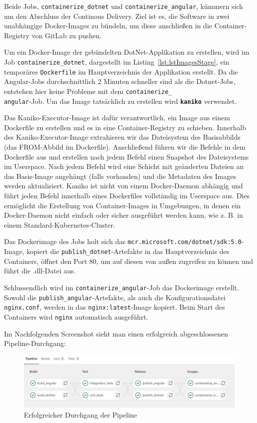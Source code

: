Beide Jobs, \texttt{containerize\_dotnet} und \texttt{containerize\_angular}, kümmern sich um den Abschluss der Continous Delivery. Ziel ist es, die Software in zwei unabhängige Docker-Images zu bündeln, um diese anschließen in die Container-Registry von GitLab zu pushen.

Um ein Docker-Image der gebündelten DotNet-Applikation zu  erstellen, wird im Job \texttt{containerize\_dotnet}, dargestellt im Listing~\ref{lst:lstImagesStage}, ein temporäres \texttt{Dockerfile} im Hauptverzeichnis der Applikation erstellt. Da die Angular-Jobs durchschnittlich 2 Minuten schneller sind als die Dotnet-Jobs, entstehen hier keine Probleme mit dem \texttt{containerize\_\\angular}-Job. Um das Image tatsächlich zu erstellen wird \textbf{\texttt{kaniko}} verwendet.

Das Kaniko-Executor-Image ist dafür verantwortlich, ein Image aus einem Dockerfile zu erstellen und es in eine Container-Registry zu schieben. Innerhalb des Kaniko-Executor-Image extrahieren wir das Dateisystem des Basisabbilds (das FROM-Abbild im Dockerfile). Anschließend führen wir die Befehle in dem Dockerfile aus und erstellen nach jedem Befehl einen Snapshot des Dateisystems im Userspace. Nach jedem Befehl wird eine Schicht mit geänderten Dateien an das Basis-Image angehängt (falls vorhanden) und die Metadaten des Images werden aktualisiert\cite{kaniko}. Kaniko ist nicht von einem Docker-Daemon abhängig und führt jeden Befehl innerhalb eines Dockerfiles vollständig im Userspace aus. Dies ermöglicht die Erstellung von Container-Images in Umgebungen, in denen ein Docker-Daemon nicht einfach oder sicher ausgeführt werden kann, wie z. B. in einem Standard-Kubernetes-Cluster.\cite{kaniko}

Das Dockerimage des Jobs holt sich das \texttt{mcr.microsoft.com/dotnet/sdk:5.0}-Image, kopiert die \texttt{publish\_dotnet}-Artefakte in das Hauptverzeichnis des Containers, öffnet den Port 80, um auf diesen von außen zugreifen zu können und führt die .dll-Datei aus.

Schlussendlich wird im \texttt{containerize\_angular}-Job das Dockerimage erstellt. Sowohl die \texttt{publish\_angular}-Artefakte, als auch die Konfigurationsdatei \texttt{nginx.conf}, werden in das \texttt{nginx:latest}-Image kopiert. Beim Start des Containers wird \texttt{nginx} automatisch ausgeführt.

Im Nachfolgenden Screenshot sieht man einen erfolgreich abgeschlossenen Pipeline-Durchgang:

\begin{figure}[H]
	\centerline{
		\includegraphics[width=1\textwidth, frame]{./grafiken/build_test_release_successful.JPG}
	}
	\vskip0pt
	\caption{Erfolgreicher Durchgang der Pipeline}
\end{figure}